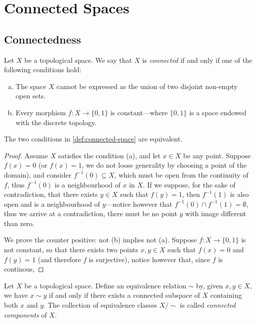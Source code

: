 \section{Connected Spaces}

\subsection{Connectedness}

\begin{definition}
\label{def:connected-space}
Let \(X\) be a topological space. We say that \(X\) is \emph{connected} if and
only if one of the following conditions hold:
\begin{enumerate}[(a)]\setlength\itemsep{0em}
\item The space \(X\) cannot be expressed as the union of two disjoint non-empty
open sets.
\item Every morphism \(f: X \to \{0, 1\}\) is constant---where \(\{0, 1\}\) is
a space endowed with the discrete topology.
\end{enumerate}
\end{definition}

\begin{corollary}
The two conditions in \cref{def:connected-space} are equivalent.
\end{corollary}

\begin{proof}
Assume \(X\) satisfies the condition (a), and let \(x \in X\) be any
point. Suppose \(f(x) = 0\) (or \(f(x) = 1\), we do not loose generality by
choosing a point of the domain), and consider \(f^{-1}(0) \subseteq X\), which
must be open from the continuity of \(f\), thus \(f^{-1}(0)\) is a neighbourhood
of \(x\) in \(X\). If we suppose, for the sake of contradiction, that there
exists \(y \in X\) such that \(f(y) = 1\), then \(f^{-1}(1)\) is also open and
is a neighbourhood of \(y\)---notice however that \(f^{-1}(0) \cap f^{-1}(1) =
\emptyset\), thus we arrive at a contradiction, there must be no point \(y\)
with image different than zero.

We prove the counter positive: not (b) implies not (a). Suppose \(f: X
\to \{0, 1\}\) is not constant, so that there exists two points \(x, y \in X\)
such that \(f(x) = 0\) and \(f(y) = 1\) (and therefore \(f\) is surjective),
notice however that, since \(f\) is continous,
\end{proof}

\begin{definition}
\label{def:connected-components}
Let \(X\) be a topological space. Define an equivalence relation \(\sim\) by,
given \(x, y \in X\), we have \(x \sim y\) if and only if there exists a
connected subspace of \(X\) containing both \(x\) and \(y\). The collection of
equivalence classes \(X/{\sim}\) is called \emph{connected components} of \(X\).
\end{definition}

